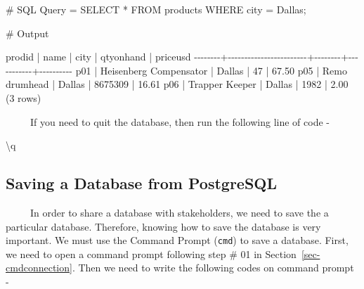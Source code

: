 \documentclass[
  letterpaper,
  DIV=11,
  numbers=noendperiod]{scrreprt}
\newenvironment{Shaded}{\begin{snugshade}}{\end{snugshade}}
\newcommand{\CommentTok}[1]{\textcolor[rgb]{0.37,0.37,0.37}{#1}}
\newcommand{\DecValTok}[1]{\textcolor[rgb]{0.68,0.00,0.00}{#1}}
\newcommand{\FloatTok}[1]{\textcolor[rgb]{0.68,0.00,0.00}{#1}}
\newcommand{\NormalTok}[1]{\textcolor[rgb]{0.00,0.23,0.31}{#1}}
\newcommand{\OtherTok}[1]{\textcolor[rgb]{0.00,0.23,0.31}{#1}}
\newcommand{\SpecialCharTok}[1]{\textcolor[rgb]{0.37,0.37,0.37}{#1}}
\newcommand{\StringTok}[1]{\textcolor[rgb]{0.13,0.47,0.30}{#1}}
\begin{document}
\begin{Shaded}
\begin{Highlighting}[]
\CommentTok{\# SQL Query = }
\NormalTok{SELECT }\SpecialCharTok{*}\NormalTok{ FROM products WHERE city }\OtherTok{=} \StringTok{\textquotesingle{}Dallas\textquotesingle{}}\NormalTok{;}


\CommentTok{\# Output }

\NormalTok{ prodid }\SpecialCharTok{|}\NormalTok{          name          }\SpecialCharTok{|}\NormalTok{  city  }\SpecialCharTok{|}\NormalTok{ qtyonhand }\SpecialCharTok{|}\NormalTok{ priceusd}
\SpecialCharTok{{-}{-}{-}{-}{-}{-}{-}{-}+{-}{-}{-}{-}{-}{-}{-}{-}{-}{-}{-}{-}{-}{-}{-}{-}{-}{-}{-}{-}{-}{-}{-}{-}+{-}{-}{-}{-}{-}{-}{-}{-}+{-}{-}{-}{-}{-}{-}{-}{-}{-}{-}{-}+{-}{-}{-}{-}{-}{-}{-}{-}{-}{-}}
\NormalTok{ p01    }\SpecialCharTok{|}\NormalTok{ Heisenberg Compensator }\SpecialCharTok{|}\NormalTok{ Dallas }\SpecialCharTok{|}        \DecValTok{47} \SpecialCharTok{|}    \FloatTok{67.50}
\NormalTok{ p05    }\SpecialCharTok{|}\NormalTok{ Remo drumhead          }\SpecialCharTok{|}\NormalTok{ Dallas }\SpecialCharTok{|}   \DecValTok{8675309} \SpecialCharTok{|}    \FloatTok{16.61}
\NormalTok{ p06    }\SpecialCharTok{|}\NormalTok{ Trapper Keeper         }\SpecialCharTok{|}\NormalTok{ Dallas }\SpecialCharTok{|}      \DecValTok{1982} \SpecialCharTok{|}     \FloatTok{2.00}
\NormalTok{(}\DecValTok{3}\NormalTok{ rows)}
\end{Highlighting}
\end{Shaded}

~~~~~If you need to quit the database, then run the following line of
code -

\begin{Shaded}
\begin{Highlighting}[]
\NormalTok{\textbackslash{}q}
\end{Highlighting}
\end{Shaded}

\subsection{Saving a Database from
PostgreSQL}\label{saving-a-database-from-postgresql}

~~~~~In order to share a database with stakeholders, we need to save the
a particular database. Therefore, knowing how to save the database is
very important. We must use the Command Prompt (\texttt{cmd}) to save a
database. First, we need to open a command prompt following step \# 01
in Section~\ref{sec-cmdconnection}. Then we need to write the following
codes on command prompt -
\end{document}
